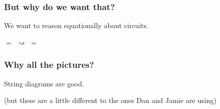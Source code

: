 \begin{frame}
    \frametitle{But why do we want that?}
    \centering
    \LARGE
    We want to reason \alert{equationally} about circuits.

    \normalsize
    \vspace{2em}

    \pause

    \quad
    \pause
    \(=\)
    \quad
    \quad
    \pause
    \(\rightsquigarrow\)
    \quad
    \quad
    \pause
    \(=\)
    \quad

\end{frame}
\begin{frame}
    \frametitle{Why all the pictures?}
    \centering
    \LARGE
    \pause
    String diagrams are \alert{good}.

    \normalsize

    \vspace{1em}

    \pause

    \pause\pause
    \vspace{1em}
    (but these are a little different to the ones Dan and Jamie are using)

\end{frame}